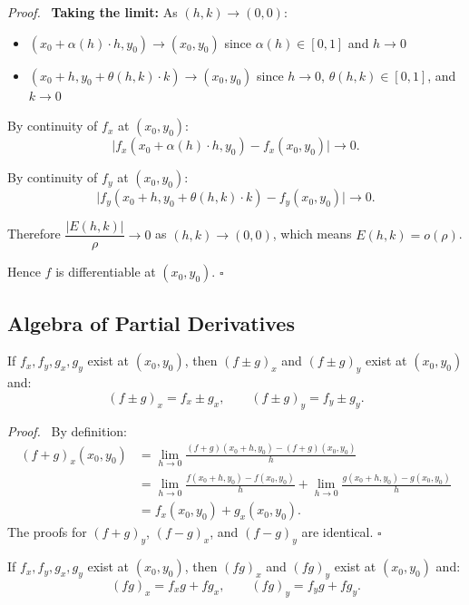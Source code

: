 \documentclass[11pt]{report}
\renewenvironment{proof}[1][Proof]{\par\noindent\textit{#1.}\ }{\hfill$\square$\par\medskip}
\begin{document}
\begin{proof}
\textbf{Taking the limit:} As $(h, k) \to (0, 0)$:
\begin{itemize}[itemsep=2pt]
    \item $(x_0 + \alpha(h) \cdot h, y_0) \to (x_0, y_0)$ since $\alpha(h) \in [0, 1]$ and $h \to 0$
    \item $(x_0 + h, y_0 + \theta(h, k) \cdot k) \to (x_0, y_0)$ since $h \to 0$, $\theta(h,k) \in [0, 1]$, and $k \to 0$
\end{itemize}

By continuity of $f_x$ at $(x_0, y_0)$:
\[
\bigl|f_x(x_0 + \alpha(h) \cdot h, y_0) - f_x(x_0, y_0)\bigr| \to 0.
\]

By continuity of $f_y$ at $(x_0, y_0)$:
\[
\bigl|f_y(x_0 + h, y_0 + \theta(h, k) \cdot k) - f_y(x_0, y_0)\bigr| \to 0.
\]

Therefore $\dfrac{|E(h, k)|}{\rho} \to 0$ as $(h, k) \to (0, 0)$, which means $E(h, k) = o(\rho)$.

Hence $f$ is differentiable at $(x_0, y_0)$.
\end{proof}

\subsection{Algebra of Partial Derivatives}

\begin{theorem}
If $f_x, f_y, g_x, g_y$ exist at $(x_0, y_0)$, then $(f \pm g)_x$ and $(f \pm g)_y$ exist at $(x_0, y_0)$ and:
\[
(f \pm g)_x = f_x \pm g_x, \qquad (f \pm g)_y = f_y \pm g_y.
\]
\end{theorem}

\begin{proof}
By definition:
\begin{align*}
(f + g)_x(x_0, y_0) &= \lim_{h \to 0} \frac{(f + g)(x_0 + h, y_0) - (f + g)(x_0, y_0)}{h} \\
&= \lim_{h \to 0} \frac{f(x_0 + h, y_0) - f(x_0, y_0)}{h} + \lim_{h \to 0} \frac{g(x_0 + h, y_0) - g(x_0, y_0)}{h} \\
&= f_x(x_0, y_0) + g_x(x_0, y_0).
\end{align*}
The proofs for $(f + g)_y$, $(f - g)_x$, and $(f - g)_y$ are identical.
\end{proof}

\begin{theorem}
If $f_x, f_y, g_x, g_y$ exist at $(x_0, y_0)$, then $(fg)_x$ and $(fg)_y$ exist at $(x_0, y_0)$ and:
\[
(fg)_x = f_x g + f g_x, \qquad (fg)_y = f_y g + f g_y.
\]
\end{theorem}
\end{document}
